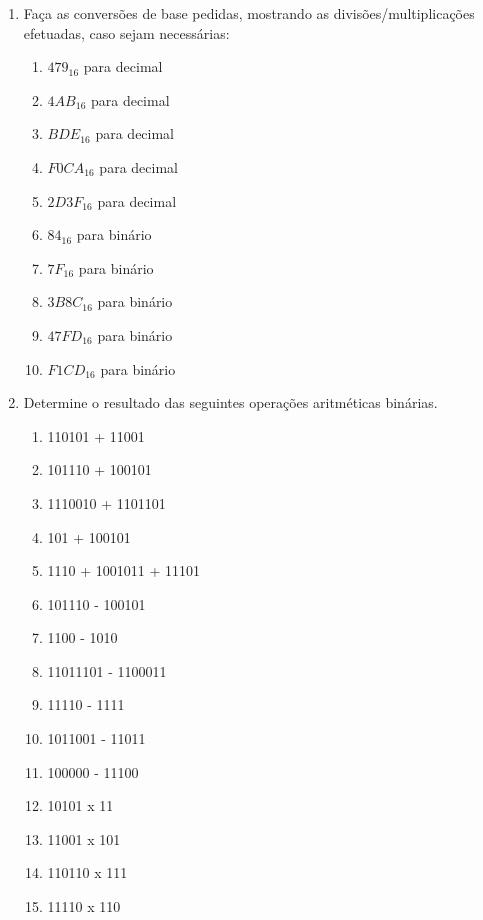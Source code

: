 \documentclass[12pt,onepage,a4paper]{memoir}
\begin{document}
\begin{enumerate}
    \item Faça as conversões de base pedidas, mostrando as divisões/multiplicações efetuadas, caso sejam necessárias:
    \begin{multicols}{2}
    \begin{enumerate}
        \item $479_{16}$ para decimal
        \item $4AB_{16}$ para decimal
        \item $BDE_{16}$ para decimal
        \item $F0CA_{16}$ para decimal
        \item $2D3F_{16}$ para decimal
        \item $84_{16}$ para binário
        \item $7F_{16}$ para binário
        \item $3B8C_{16}$ para binário
        \item $47FD_{16}$ para binário
        \item $F1CD_{16}$ para binário
    \end{enumerate}
    \end{multicols}
    
     \item Determine o resultado das seguintes operações aritméticas binárias.
     \begin{multicols}{2}
        \begin{enumerate}
            \item 110101 + 11001
            \item 101110 + 100101
            \item 1110010 + 1101101
            \item 101 + 100101
            \item 1110 + 1001011 + 11101
            \item 101110 - 100101
            \item 1100 - 1010
            \item 11011101 - 1100011
            \item 11110 - 1111
            \item 1011001 - 11011
            \item 100000 - 11100
            \item 10101 x 11
            \item 11001 x 101
            \item 110110 x 111
            \item 11110 x 110
        \end{enumerate}
    \end{multicols}    
           


\end{enumerate}
\end{document}
